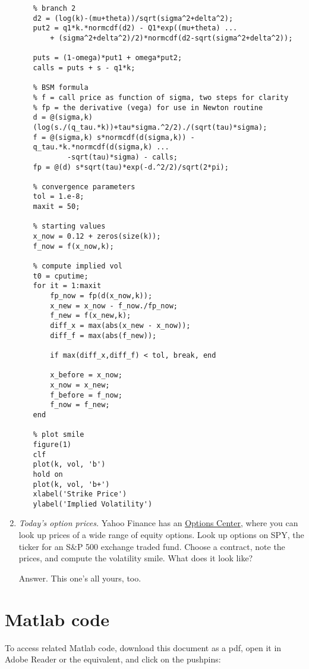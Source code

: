 \documentclass[11pt]{article}
\begin{document}
\begin{enumerate}
\begin{enumerate}
{\begin{verbatim}
% branch 2
d2 = (log(k)-(mu+theta))/sqrt(sigma^2+delta^2);
put2 = q1*k.*normcdf(d2) - Q1*exp((mu+theta) ...
    + (sigma^2+delta^2)/2)*normcdf(d2-sqrt(sigma^2+delta^2));

puts = (1-omega)*put1 + omega*put2;
calls = puts + s - q1*k;

% BSM formula
% f = call price as function of sigma, two steps for clarity
% fp = the derivative (vega) for use in Newton routine
d = @(sigma,k) (log(s./(q_tau.*k))+tau*sigma.^2/2)./(sqrt(tau)*sigma);
f = @(sigma,k) s*normcdf(d(sigma,k)) - q_tau.*k.*normcdf(d(sigma,k) ...
        -sqrt(tau)*sigma) - calls;
fp = @(d) s*sqrt(tau)*exp(-d.^2/2)/sqrt(2*pi);

% convergence parameters
tol = 1.e-8;
maxit = 50;

% starting values
x_now = 0.12 + zeros(size(k));
f_now = f(x_now,k);

% compute implied vol
t0 = cputime;
for it = 1:maxit
    fp_now = fp(d(x_now,k));
    x_new = x_now - f_now./fp_now;
    f_new = f(x_new,k);
    diff_x = max(abs(x_new - x_now));
    diff_f = max(abs(f_new));

    if max(diff_x,diff_f) < tol, break, end

    x_before = x_now;
    x_now = x_new;
    f_before = f_now;
    f_now = f_new;
end

% plot smile
figure(1)
clf
plot(k, vol, 'b')
hold on
plot(k, vol, 'b+')
xlabel('Strike Price')
ylabel('Implied Volatility')
\end{verbatim}
}
\end{enumerate}

\item {\it Today's option prices.\/}
Yahoo Finance has an
\href{http://finance.yahoo.com/options/}{Options Center},
where you can look up prices of a wide range of equity options.
Look up options on SPY, the ticker for
an S\&P 500 exchange traded fund.
Choose a contract, note the prices, and compute the volatility smile.
What does it look like?

Answer.  This one's all yours, too.

\end{enumerate}


\section*{Matlab code}

To access related Matlab code, download this document as a pdf, open it in Adobe Reader or the equivalent, and click on the pushpins:



\end{document}
